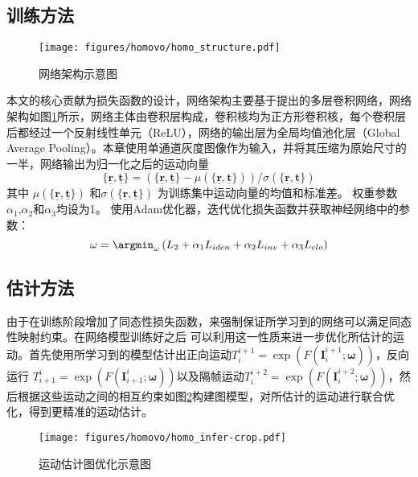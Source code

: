 \subsection{训练方法}
\label{sec:homo_method_train}
%
\begin{figure}[t]
    \centering
    \texttt{[image: figures/homovo/homo\_structure.pdf]}
    \caption{网络架构示意图}
    \label{fig:homo_structure}
  \end{figure}

本文的核心贡献为损失函数的设计，网络架构主要基于\cite{zhou2017unsupervised}提出的多层卷积网络，网络架构如图\ref{fig:homo_structure}所示，网络主体由卷积层构成，卷积核均为正方形卷积核，每个卷积层后都经过一个反射线性单元（ReLU），网络的输出层为全局均值池化层（Global Average Pooling）。本章使用单通道灰度图像作为输入，并将其压缩为原始尺寸的一半，网络输出为归一化之后的运动向量
\begin{equation}
\{\mathbf{\underline{r}},\mathbf{\underline{t}}\} = (\{\mathbf{\underline{r}},\mathbf{\underline{t}}\} - \mu(\{\mathbf{\underline{r}},\mathbf{\underline{t}}\}))/\sigma(\{\mathbf{\underline{r}},\mathbf{\underline{t}}\})
\end{equation}
其中 $\mu(\{\mathbf{\underline{r}},\mathbf{\underline{t}}\})$ 和$\sigma(\{\mathbf{\underline{r}},\mathbf{\underline{t}}\})$
为训练集中运动向量的均值和标准差。 权重参数 $\alpha_1$,$\alpha_2$和$\alpha_3$均设为1。
使用Adam优化器，迭代优化损失函数并获取神经网络中的参数：
\begin{equation}
    \mathbf{\omega} = \argmin_{\mathbf{\omega}}\left( L_2 + \alpha_1 L_{iden} +\alpha_2L_{inv}+\alpha_3L_{clo}\right)
\end{equation}

\subsection{估计方法}
\label{sec:homo_method_predict}
由于在训练阶段增加了同态性损失函数，来强制保证所学习到的网络可以满足同态性映射约束。在网络模型训练好之后
可以利用这一性质来进一步优化所估计的运动。首先使用所学习到的模型估计出正向运动$T_i^{i+1}=\exp(F(\mathbf{I}_i^{i+1};\mathbf{\omega}))$，反向运行
$T_{i+1}^i=\exp(F(\mathbf{I}_{i+1}^i;\mathbf{\omega}))$以及隔帧运动$T_i^{i+2}=\exp(F(\mathbf{I}_i^{i+2};\mathbf{\omega}))$，然后根据这些运动之间的相互约束如图\ref{fig:homo_infer}构建图模型，对所估计的运动进行联合优化，得到更精准的运动估计。
\begin{figure}[t]
    \centering
    \texttt{[image: figures/homovo/homo\_infer-crop.pdf]}
    \caption{运动估计图优化示意图}
    \label{fig:homo_infer}
  \end{figure}

